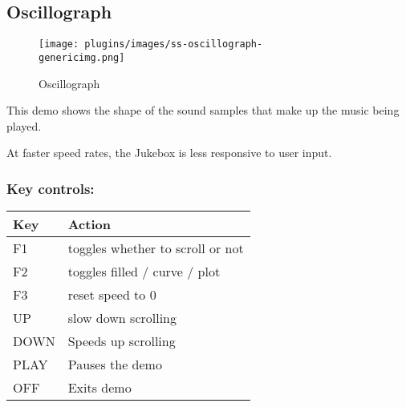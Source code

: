 \subsection{Oscillograph}
\begin{figure}[h!]
\begin{center}
\texttt{[image: plugins/images/ss-oscillograph-\\genericimg.png]}
\end{center}
\caption{Oscillograph}
\end{figure}

This demo shows the shape of the sound samples that make up the music
being played.

At faster speed rates, the Jukebox is less responsive to user input.

\subsubsection{Key controls:}

\begin{table}[h!]
\begin{center}
\begin{tabular}{@{}ll@{}}\toprule
\textbf{Key} & \textbf{Action} \\\midrule
F1 & toggles whether to scroll or not \\
F2 & toggles filled / curve / plot \\
F3 & reset speed to 0 \\
UP & slow down scrolling \\
DOWN & Speeds up scrolling \\
PLAY & Pauses the demo \\
OFF & Exits demo \\\bottomrule
\end{tabular}
\end{center}
\end{table}

